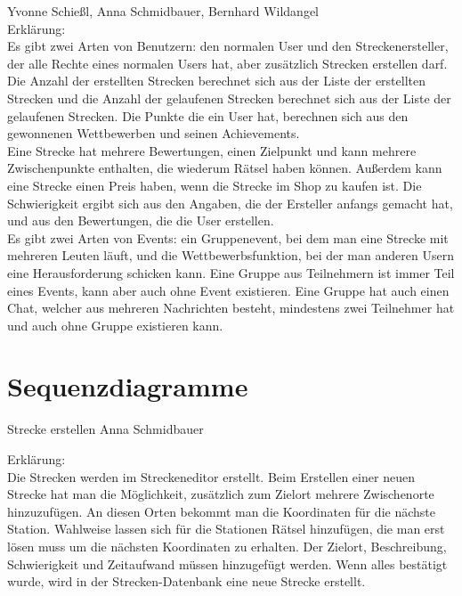 \documentclass[a4paper, 12pt]{article}
\begin{document}
\begin{figure}[H] 
\centering
	\fbox{\begin{minipage}{16cm} 
	\end{minipage}}
\end{figure}
Yvonne Schießl, Anna Schmidbauer, Bernhard Wildangel\\
Erklärung:\\
Es gibt zwei Arten von Benutzern: den normalen User und den Streckenersteller, der alle Rechte eines normalen Users hat, aber zusätzlich Strecken erstellen darf. Die Anzahl der erstellten Strecken berechnet sich aus der Liste der erstellten Strecken und die Anzahl der gelaufenen Strecken berechnet sich aus der Liste der gelaufenen Strecken. Die Punkte die ein User hat, berechnen sich aus den gewonnenen Wettbewerben und seinen Achievements.\\
Eine Strecke hat mehrere Bewertungen, einen Zielpunkt und kann mehrere Zwischenpunkte enthalten, die wiederum Rätsel haben können. Außerdem kann eine Strecke einen Preis haben, wenn die Strecke im Shop zu kaufen ist. Die Schwierigkeit ergibt sich aus den Angaben, die der Ersteller anfangs gemacht hat, und aus den Bewertungen, die die User erstellen.\\
Es gibt zwei Arten von Events: ein Gruppenevent, bei dem man eine Strecke mit mehreren Leuten läuft, und die Wettbewerbsfunktion, bei der man anderen Usern eine Herausforderung schicken kann. Eine Gruppe aus Teilnehmern ist immer Teil eines Events, kann aber auch ohne Event existieren. Eine Gruppe hat auch einen Chat, welcher aus mehreren Nachrichten besteht, mindestens zwei Teilnehmer hat und auch ohne Gruppe existieren kann.\\


\section{Sequenzdiagramme}

{\Large Strecke erstellen}
Anna Schmidbauer
\begin{figure}[H] 
\centering
	\fbox{\begin{minipage}{16cm} 
	\end{minipage}}
\end{figure}

Erklärung:\\
Die Strecken werden im Streckeneditor erstellt. Beim Erstellen einer neuen Strecke hat man die Möglichkeit, zusätzlich zum Zielort mehrere Zwischenorte hinzuzufügen. An diesen Orten bekommt man die Koordinaten für die nächste Station. Wahlweise lassen sich für die Stationen Rätsel hinzufügen, die man erst lösen muss um die nächsten Koordinaten zu erhalten. Der Zielort, Beschreibung, Schwierigkeit und Zeitaufwand müssen hinzugefügt werden. Wenn alles bestätigt wurde, wird in der Strecken-Datenbank eine neue Strecke erstellt.\\
\end{document}
